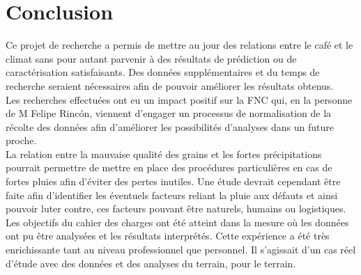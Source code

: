 

\chapter{Conclusion}










Ce projet de recherche a permis de mettre au jour des relations entre le café et le climat sans pour autant parvenir à des résultats de prédiction ou de caractérisation satisfaisants. Des données supplémentaires et du temps de recherche seraient nécessaires afin de pouvoir améliorer les résultats obtenus. \\

\noindent Les recherches effectuées ont eu un impact positif sur la FNC qui, en la personne de M Felipe Rincón, viennent d'engager un processus de normalisation de la récolte des données afin d'améliorer les possibilités d'analyses dans un future proche. \\

\noindent La relation entre la mauvaise qualité des grains et les fortes précipitations pourrait permettre de mettre en place des procédures particulières en cas de fortes pluies afin d'éviter des pertes inutiles. Une étude devrait cependant être faite afin d'identifier les éventuels facteurs reliant la pluie aux défauts et ainsi pouvoir luter contre, ces facteurs pouvant être naturels, humains ou logistiques. \\

\noindent Les objectifs du cahier des charges ont été atteint dans la mesure où les données ont pu être analysées et les résultats interprétés. Cette expérience a été très enrichissante tant au niveau professionnel que personnel. Il s'agissait d'un cas réel d'étude avec des données et des analyses du terrain, pour le terrain. 



